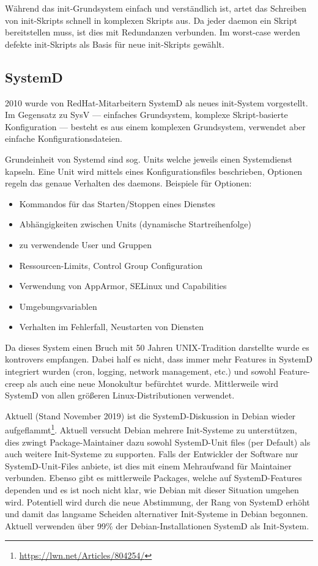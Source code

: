 Während das init-Grundsystem einfach und verständlich ist, artet das Schreiben von init-Skripts schnell in komplexen Skripts aus. Da jeder daemon ein Skript bereitstellen muss, ist dies mit Redundanzen verbunden. Im worst-case werden defekte init-Skripts als Basis für neue init-Skripts gewählt.

\subsection{SystemD}

2010 wurde von RedHat-Mitarbeitern SystemD als neues init-System vorgestellt. Im Gegensatz zu SysV --- einfaches Grundsystem, komplexe Skript-basierte Konfiguration --- besteht es aus einem komplexen Grundsystem, verwendet aber einfache Konfigurationsdateien.

Grundeinheit von Systemd sind sog. Units welche jeweils einen Systemdienst kapseln. Eine Unit wird mittels eines Konfigurationsfiles beschrieben, Optionen regeln das genaue Verhalten des daemons. Beispiele für Optionen:

\begin{itemize}
	\item Kommandos für das Starten/Stoppen eines Dienstes
	\item Abhängigkeiten zwischen Units (dynamische Startreihenfolge)
	\item zu verwendende User und Gruppen
	\item Ressourcen-Limits, Control Group Configuration
	\item Verwendung von AppArmor, SELinux und Capabilities
	\item Umgebungsvariablen
	\item Verhalten im Fehlerfall, Neustarten von Diensten
\end{itemize}

Da dieses System einen Bruch mit 50 Jahren UNIX-Tradition darstellte wurde es kontrovers empfangen. Dabei half es nicht, dass immer mehr Features in SystemD integriert wurden (cron, logging, network management, etc.) und sowohl Feature-creep als auch eine neue Monokultur befürchtet wurde. Mittlerweile wird SystemD von allen größeren Linux-Distributionen verwendet.

Aktuell (Stand November 2019) ist die SystemD-Diskussion in Debian wieder aufgeflammt\footnote{\url{https://lwn.net/Articles/804254/}}. Aktuell versucht Debian mehrere Init-Systeme zu unterstützen, dies zwingt Package-Maintainer dazu sowohl SystemD-Unit files (per Default) als auch weitere Init-Systeme zu supporten. Falls der Entwickler der Software nur SystemD-Unit-Files anbiete, ist dies mit einem Mehraufwand für Maintainer verbunden. Ebenso gibt es mittlerweile Packages, welche auf SystemD-Features dependen und es ist noch nicht klar, wie Debian mit dieser Situation umgehen wird. Potentiell wird durch die neue Abstimmung, der Rang von SystemD erhöht und damit das langsame Scheiden alternativer Init-Systeme in Debian begonnen. Aktuell verwenden über 99\% der Debian-Installationen SystemD als Init-System.

